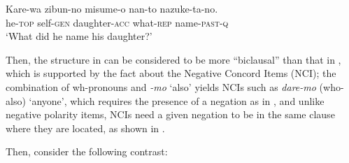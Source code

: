 \documentclass[output=paper]{langsci/langscibook}
\begin{document}
\ea \gll Kare-wa zibun-no misume-o nan-to nazuke-ta-no.\\
he-\textsc{top} self-\textsc{gen} daughter-\textsc{acc} what-\textsc{rep} name-\textsc{past-q}\\
\glt `What did he name his daughter?'
\z

Then, the structure in  can be considered to be more ``biclausal'' than that in , which is supported by the fact about the Negative Concord Items (NCI); the combination of wh-pronouns and \textit{-mo} `also' yields NCIs such as \textit{dare-mo} (who-also) `anyone', which requires the presence of a negation as in , and unlike negative polarity items, NCIs need a given negation to be in the same clause where they are located, as shown in .

\ea\label{shimamu25} \begin{xlist}
\end{xlist}
\z

\ea\label{shimamu26} \begin{xlist}
\end{xlist}
\z
Then, consider the following contrast:
\end{document}
